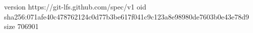 version https://git-lfs.github.com/spec/v1
oid sha256:071afe40c478762124c0d77b3be617f041c9c123a8e98980de7603b0e43e78d9
size 706901
